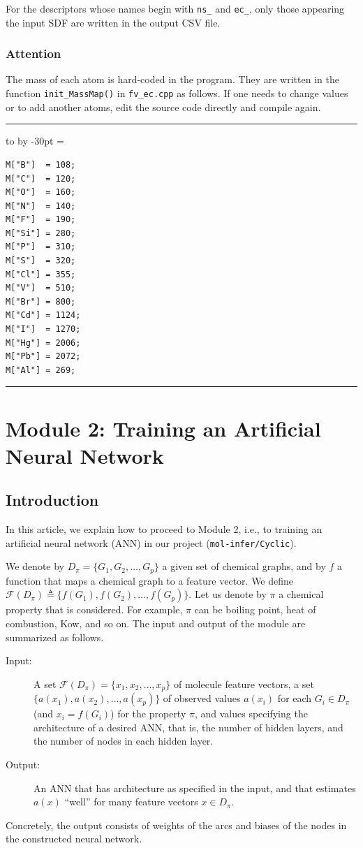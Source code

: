 \documentclass[11pt,titlepage,dvipdfmx,twoside]{book}
\newenvironment{myframe}{\begin{trivlist}\item[]
    \hrule
    \hbox to \linewidth\bgroup
    \advance\linewidth by -30pt
    \hsize=\linewidth
    \vrule\hfill
    \vbox\bgroup
    \vskip15pt
    \def\thempfootnote{\arabic{mpfootnote}}
    \begin{minipage}{\linewidth}}{%
    \end{minipage}\vskip15pt
    \egroup\hfill\vrule
    \egroup\hrule
\end{trivlist}}
\newcommand{\project}{{\tt mol-infer/Cyclic}}
\begin{document}
For the descriptors whose names begin with {\tt ns\_} and {\tt ec\_},
only those appearing the input SDF
are written in the output CSV file. 

\subsection{Attention}
\label{chap:caution}

The mass of each atom is hard-coded in the program.
They are written in the function {\tt init\_MassMap()}
in {\tt fv\_ec.cpp} as follows.
If one needs to change values or to add another atoms,
edit the source code directly and compile again.

\begin{myframe}
\begin{verbatim}
M["B"]  = 108;
M["C"]  = 120;
M["O"]  = 160;
M["N"]  = 140;
M["F"]  = 190;
M["Si"] = 280;
M["P"]  = 310;
M["S"]  = 320;
M["Cl"] = 355;
M["V"]  = 510;
M["Br"] = 800;
M["Cd"] = 1124;
M["I"]  = 1270;
M["Hg"] = 2006;
M["Pb"] = 2072;
M["Al"] = 269;
\end{verbatim}
\end{myframe}


\chapter{Module 2:
Training an Artificial Neural Network
}


\section{Introduction}
In this article,
we explain how to proceed to  Module 2, 
i.e., to training an artificial neural network (ANN)
in our project (\project).

We denote by $D_\pi=\{G_1,G_2,\dots,G_p\}$ a given set of chemical graphs,
and by $f$ a function that maps a chemical graph to a feature vector.
We define ${\mathcal F}(D_\pi)\triangleq\{f(G_1),f(G_2),\dots,f(G_p)\}$. 
Let us denote by $\pi$ a chemical property that is considered.
For example, $\pi$ can be boiling point, heat of combustion, Kow, and so on. 
The input and output of the module are summarized as follows.

\begin{oframed}
\begin{description}
\item[Input:] 
A set ${\mathcal F}(D_\pi)=\{x_1, x_2,\dots, x_p\}$ of molecule feature vectors,
  a set $\{a(x_1), a(x_2), \dots, a(x_p)\}$ of observed values $a(x_i)$ for 
  each $G_i\in D_\pi$ (and $x_i=f(G_i)$)
  for the property $\pi$,
  and values specifying the architecture of a desired  ANN,
  that is, the number of hidden layers, 
  and the number of nodes in each hidden layer. 
\item[Output:] 
An ANN that
  has architecture as specified in the input,
  and that estimates $a(x)$ ``well'' for many feature vectors $x \in D_\pi$. 
\end{description}
\end{oframed}
%
Concretely, the output consists of weights of the arcs
and biases of the nodes in the constructed neural network. 
\end{document}
